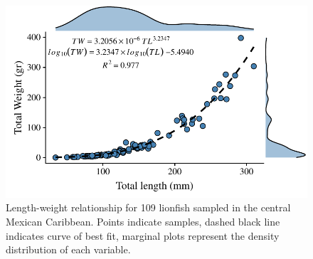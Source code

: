 \documentclass[]{article}
\theoremstyle{definition}
\theoremstyle{definition}
\theoremstyle{definition}
\theoremstyle{remark}
\begin{document}
\begin{figure}
\centering
\includegraphics{Manuscript_files/figure-latex/unnamed-chunk-10-1.pdf}
\caption{\label{fig:unnamed-chunk-10}\label{fig:l-w-carib}Length-weight
relationship for 109 lionfish sampled in the central Mexican Caribbean.
Points indicate samples, dashed black line indicates curve of best fit,
marginal plots represent the density distribution of each variable.}
\end{figure}
\end{document}
